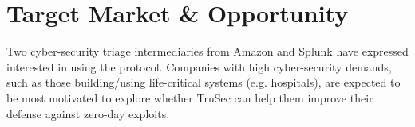 \vspace{-0.16cm}
\section{Target Market \& Opportunity}
\vspace{-0.15cm}
Two cyber-security triage intermediaries from Amazon and Splunk have expressed interested in using the protocol. Companies with high cyber-security demands, such as those building/using life-critical systems (e.g. hospitals), are expected to be most motivated to explore whether TruSec can help them improve their defense against zero-day exploits.